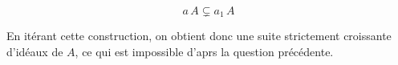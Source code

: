 \begin{sol}
\begin{enumerate}
\begin{equation}
a\,A \subsetneq a_1\, A
\label{eq:st_inc}
\end{equation}

En it\'erant cette construction, on obtient donc une suite strictement croissante d'id\'eaux de \(A\), %
ce qui est impossible d'aprs la question pr\'ec\'edente.
\end{enumerate}
\end{sol}